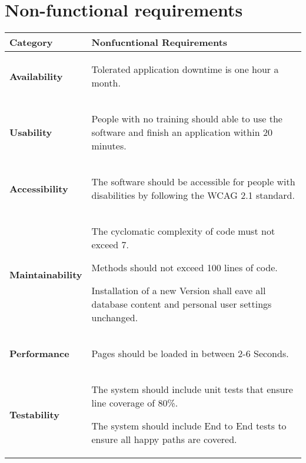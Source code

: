 \newpage
\section{Non-functional requirements}
\label{sec:nfr}
\begin{table}[htb!]
\begin{tabularx}{\textwidth}{l|X}
	\textbf{Category} & \textbf{Nonfucntional Requirements} \\
	\hline
	\textbf{Availability} & 
	    \begin{compactitem}
	        \item Tolerated application downtime is one hour a month.
	    \end{compactitem}\\
	\hline
	\textbf{Usability} &
	    \begin{compactitem}
	        \item People with no training should able to use the software and finish an application within 20 minutes.
	    \end{compactitem}\\
	\hline
	\textbf{Accessibility} & 
	\begin{compactitem}
	    \item The software should be accessible for people with disabilities by following the WCAG 2.1 standard.
	\end{compactitem}\\
	\hline
	\textbf{Maintainability} &
	    \begin{compactitem}
	        \item The cyclomatic complexity of code must not exceed 7.
	        \item Methods should not exceed 100 lines of code.
	        \item Installation of a new Version shall eave all database content and personal user settings unchanged.
	    \end{compactitem}\\
	\hline
	\textbf{Performance} &
	\begin{compactitem}
        \item Pages should be loaded in between 2-6 Seconds.
	\end{compactitem}\\
	\hline
	\textbf{Testability} &
	    \begin{compactitem}
	        \item The system should include unit tests that ensure line coverage of 80\%.
	        \item The system should include End to End tests to ensure all happy paths are covered.

\end{compactitem}
\end{tabularx}
\end{table}
